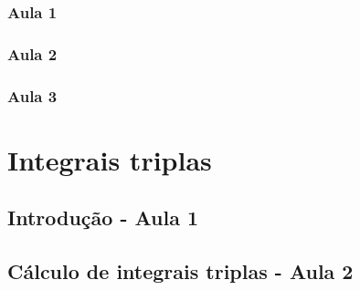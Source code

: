 \documentclass[
	12pt,				%
	openright,			%
	twoside,			%
	a4paper,			%
	english,			%
	french,				%
	spanish,			%
	brazil,				%
]{abntex2}
\begin{document}
	\subsection{Aula 1}
		
	\subsection{Aula 2}
			
	\subsection{Aula 3}
		

\chapter{Integrais triplas}\label{integrais_triplas}
	\section{Introdução - Aula 1}
				
	\section{Cálculo de integrais triplas - Aula 2}
		
	
	
	
	
	
\end{document}
